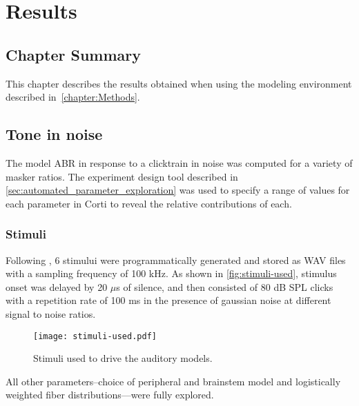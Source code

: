 \chapter{Results}
\label{chapter:Results}
\thispagestyle{myheadings}

\graphicspath{{5_Results/Figures/}}
\section{Chapter Summary} %
\label{sec:results_summary}
This chapter describes the results obtained when using the modeling environment described in~\autoref{chapter:Methods}.
\section{Tone in noise} %
\label{sec:tone_in_noise}
The model ABR in response to a clicktrain in noise was computed for a variety of masker ratios.   
The experiment design tool described in \autoref{sec:automated_parameter_exploration} was used to specify a range of values for each parameter in Corti to reveal the relative contributions of each. 

\subsection{Stimuli} %
\label{sub:stimuli}
Following \citeauthor{Mehraei2015Auditory,Mehraei2016Auditory}, 6 stimului were programmatically generated and stored as WAV files with a sampling frequency of 100 kHz.  As shown in \autoref{fig:stimuli-used}, stimulus onset was delayed by 20 $\mu$s of silence, and then consisted of 80 dB SPL clicks with a repetition rate of 100 ms in the presence of gaussian noise at different signal to noise ratios. 

\begin{figure}[htbp]
	\centering
	\texttt{[image: stimuli-used.pdf]}
	\caption[Experimental Stimuli]{Stimuli used to drive the auditory models.}
	\label{fig:stimuli-used}
\end{figure}

All other parameters--choice of peripheral and brainstem model and logistically weighted fiber distributions---were fully explored.

